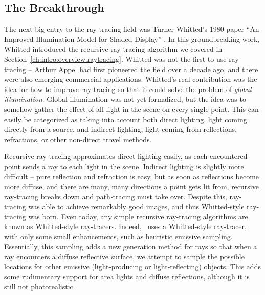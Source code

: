 \subsection{The Breakthrough}

The next big entry to the ray-tracing field was Turner Whitted's 1980 paper ``An Improved Illumination Model for Shaded Display'' \cite{whitted1980improved}.
In this groundbreaking work, Whitted introduced the recursive ray-tracing algorithm we covered in Section~\ref{ch:intro:overview:raytracing}.
Whitted was not the first to use ray-tracing -- Arthur Appel had first pioneered the field over a decade ago, and there were also emerging commercial applications.
Whitted's real contribution was the idea for how to improve ray-tracing so that it could solve the problem of {\it global illumination}.
Global illumination was not yet formalized, but the idea was to somehow gather the effect of all light in the scene on every single point.
This can easily be categorized as taking into account both direct lighting, light coming directly from a source, and indirect lighting, light coming from reflections, refractions, or other non-direct travel methods.

Recursive ray-tracing approximates direct lighting easily, as each encountered point sends a ray to each light in the scene.
Indirect lighting is slightly more difficult -- pure reflection and refraction is easy, but as soon as reflections become more diffuse, and there are many, many directions a point gets lit from, recursive ray-tracing breaks down and path-tracing must take over.
Despite this, ray-tracing was able to achieve remarkably good images, and thus Whitted-style ray-tracing was born.
Even today, any simple recursive ray-tracing algorithms are known as Whitted-style ray-tracers. Indeed, \name\ uses a Whitted-style ray-tracer, with only some small enhancements, such as heuristic emissive sampling.
Essentially, this sampling adds a new generation method for rays so that when a ray encounters a diffuse reflective surface, we attempt to sample the possible locations for other emissive (light-producing or light-reflecting) objects.
This adds some rudimentary support for area lights and diffuse reflections, although it is still not photorealistic.

